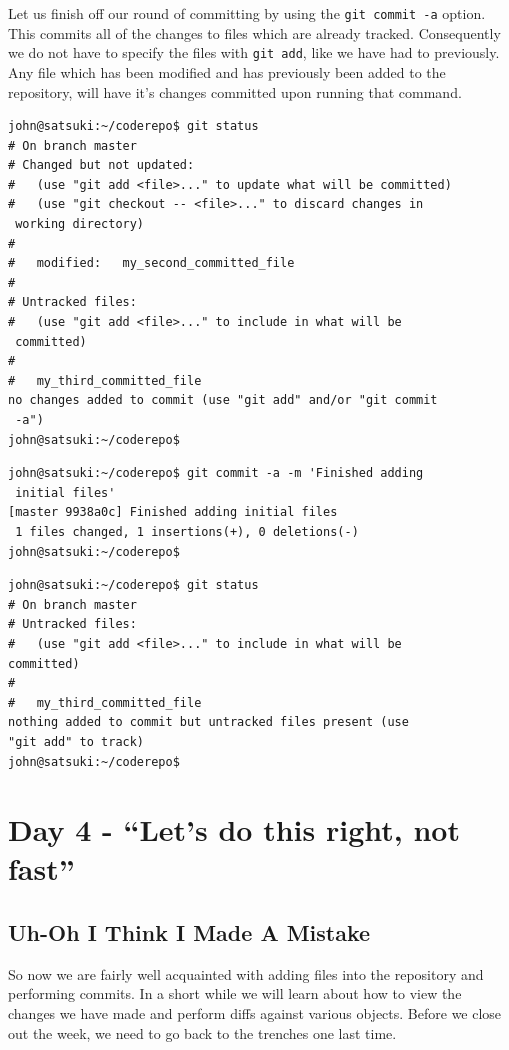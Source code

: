 Let us finish off our round of committing by using the \texttt{git commit -a} option.
This commits all of the changes to files which are already tracked.
Consequently we do not have to specify the files with \texttt{git add}, like we have had to previously.
Any file which has been modified and has previously been added to the repository, will have it's changes committed upon running that command.

\begin{Verbatim}
john@satsuki:~/coderepo$ git status
# On branch master
# Changed but not updated:
#   (use "git add <file>..." to update what will be committed)
#   (use "git checkout -- <file>..." to discard changes in
 working directory)
#
#	modified:   my_second_committed_file
#
# Untracked files:
#   (use "git add <file>..." to include in what will be
 committed)
#
#	my_third_committed_file
no changes added to commit (use "git add" and/or "git commit
 -a")
john@satsuki:~/coderepo$
\end{Verbatim}

\begin{Verbatim}
john@satsuki:~/coderepo$ git commit -a -m 'Finished adding
 initial files'
[master 9938a0c] Finished adding initial files
 1 files changed, 1 insertions(+), 0 deletions(-)
john@satsuki:~/coderepo$
\end{Verbatim}

\begin{Verbatim}
john@satsuki:~/coderepo$ git status
# On branch master
# Untracked files:
#   (use "git add <file>..." to include in what will be
committed)
#
#	my_third_committed_file
nothing added to commit but untracked files present (use
"git add" to track)
john@satsuki:~/coderepo$

\end{Verbatim}

\section{Day 4 - ``Let's do this right, not fast''}

\subsection{Uh-Oh I Think I Made A Mistake}

So now we are fairly well acquainted with adding files into the repository and performing commits.
In a short while we will learn about how to view the changes we have made and perform diffs against various objects.
Before we close out the week, we need to go back to the trenches one last time.

